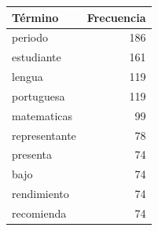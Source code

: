 \begin{tabular}{lr}
\toprule
Término & Frecuencia \\
\midrule
periodo & 186 \\
estudiante & 161 \\
lengua & 119 \\
portuguesa & 119 \\
matematicas & 99 \\
representante & 78 \\
presenta & 74 \\
bajo & 74 \\
rendimiento & 74 \\
recomienda & 74 \\
\bottomrule
\end{tabular}

